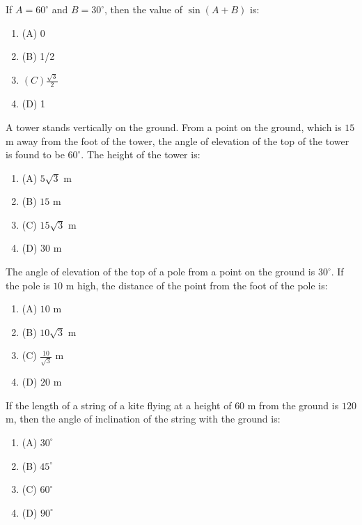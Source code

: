 \documentclass[12pt,a4paper]{exam}
\begin{document}
\begin{questions}
\question[1] If $A = 60^\circ$ and $B = 30^\circ$, then the value of $\sin(A+B)$ is:
\begin{enumerate}[label=(\Alph*)]
  \item (A) 0
  \item (B) 1/2
  \item $(C) \frac{\sqrt{3}}{2}$
  \item (D) 1
\end{enumerate}
\vspace{0.15cm}

\question[1] A tower stands vertically on the ground. From a point on the ground, which is $15$ m away from the foot of the tower, the angle of elevation of the top of the tower is found to be $60^\circ$. The height of the tower is:
\begin{enumerate}[label=(\Alph*)]
  \item (A) $5\sqrt{3}$ m
  \item (B) $15$ m
  \item (C) $15\sqrt{3}$ m
  \item (D) $30$ m
\end{enumerate}
\vspace{0.15cm}

\question[1] The angle of elevation of the top of a pole from a point on the ground is $30^\circ$. If the pole is $10$ m high, the distance of the point from the foot of the pole is:
\begin{enumerate}[label=(\Alph*)]
  \item (A) $10$ m
  \item (B) $10\sqrt{3}$ m
  \item (C) $\frac{10}{\sqrt{3}}$ m
  \item (D) $20$ m
\end{enumerate}
\vspace{0.15cm}

\question[1] If the length of a string of a kite flying at a height of $60$ m from the ground is $120$ m, then the angle of inclination of the string with the ground is:
\begin{enumerate}[label=(\Alph*)]
  \item (A) $30^\circ$
  \item (B) $45^\circ$
  \item (C) $60^\circ$
  \item (D) $90^\circ$
\end{enumerate}
\vspace{0.15cm}


\end{questions}
\end{document}
